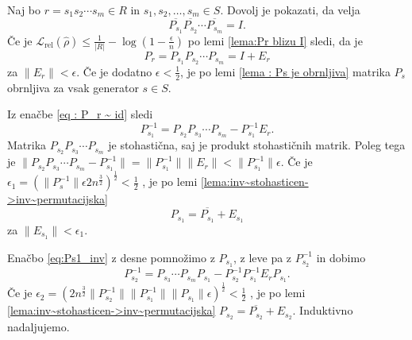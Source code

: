 \documentclass[mat2, tisk]{fmfdelo}
\newcommand{\Loss}[1]{\mathcal L _\text{#1}}
\begin{document}
\begin{dokaz}
  Naj bo $r=s_1 s_2 \dotsm s_m \in R$ in $s_1, s_2,
  \dotsc, s_m \in S$. Dovolj je pokazati, da velja
  $$
  \overline{P_{s_1} }\overline{P_{s_2}} \dotsm
  \overline{P_{s_m}} = I.
  $$
  Če je
  $\Loss{rel}(\hat\rho) \leq
  \frac{1}{|R|}-\log(1-\frac{\epsilon}{n}) $
  po lemi \ref{lema:Pr blizu I}
  sledi, da je
  \begin{equation}
    \label{eq : P_r ~ id}
    P_r = P_{s_1} P_{s_2} \dotsm P_{s_m} = I + E_r
  \end{equation}
  za $\|E_r\| < \epsilon$.
  Če je dodatno
  $\epsilon < \frac{1}{2}$,
  je po lemi   \ref{lema :
  Ps je obrnljiva}
  matrika $P_s$ obrnljiva za vsak generator $s \in S$.

  Iz enačbe \eqref{eq : P_r ~ id} sledi
  \begin{equation}
    \label{eq:Ps1_inv}
    P_{s_1}^{-1} = P_{s_2} P_{s_3} \dotsm P_{s_m} -
    P_{s_1} ^{-1}E_r.
  \end{equation}
  Matrika $P_{s_2} P_{s_3} \dotsm P_{s_m}$ je
  stohastična, saj je produkt stohastičnih matrik.
  Poleg tega je $\|P_{s_2} P_{s_3} \dotsm P_{s_m} -
  P_{s_1}^{-1}\| = \|P_{s_1}^{-1}\|\|E_r\| <
  \|P_{s_1}^{-1}\|\epsilon$.
  Če je $\epsilon_1 = \left( \|P_s^{-1}\|\epsilon 2
  n^{\frac{3}{2}} \right) ^\frac{1}{2} < \frac{1}{2}$
  , je po lemi \ref{lema:inv~stohasticen->inv~permutacijska}
  $$
  P_{s_1} = \overline{P_{s_1}} + E_{s_1}
  $$
  za $\|E_{s_1}\| < \epsilon_1$.

  Enačbo \eqref{eq:Ps1_inv} z desne pomnožimo z
  $P_{s_1}$, z leve pa
  z $P_{s_2}^{-1}$ in dobimo
  $$
  P_{s_2}^{-1} = P_{s_3} \dotsm P_{s_m}P_{s_1} -
  P_{s_2}^{-1}P_{s_1}^{-1}E_r P_{s_1}.
  $$
  Če je
  $\epsilon_2 =
  \left(
    2 n^{\frac{3}{2}} \|P_{s_2}^{-1}\|
    \|P_{s_1}^{-1}\|
    \|P_{s_1}\|\epsilon
  \right)^\frac{1}{2}
  <
  \frac{1}{2}
  $
  , je po lemi \ref{lema:inv~stohasticen->inv~permutacijska}
  $P_{s_2} = \overline{P_{s_2}} + E_{s_2}$.
  Induktivno nadaljujemo.


\end{dokaz}
\end{document}
